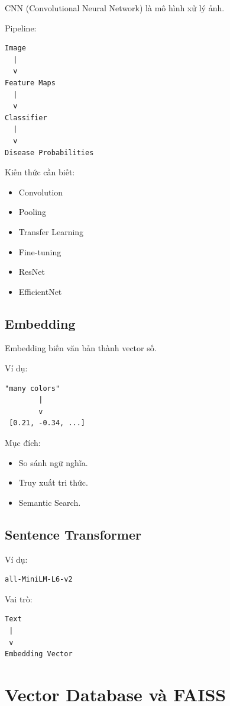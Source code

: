 \documentclass[12pt,a4paper]{article}
\begin{document}
CNN (Convolutional Neural Network) là mô hình xử lý ảnh.

Pipeline:

\begin{verbatim}
Image
  |
  v
Feature Maps
  |
  v
Classifier
  |
  v
Disease Probabilities
\end{verbatim}

Kiến thức cần biết:

\begin{itemize}
\item Convolution
\item Pooling
\item Transfer Learning
\item Fine-tuning
\item ResNet
\item EfficientNet
\end{itemize}

\subsection{Embedding}

Embedding biến văn bản thành vector số.

Ví dụ:

\begin{verbatim}
"many colors"
        |
        v
 [0.21, -0.34, ...]
\end{verbatim}

Mục đích:

\begin{itemize}
\item So sánh ngữ nghĩa.
\item Truy xuất tri thức.
\item Semantic Search.
\end{itemize}

\subsection{Sentence Transformer}

Ví dụ:

\begin{verbatim}
all-MiniLM-L6-v2
\end{verbatim}

Vai trò:

\begin{verbatim}
Text
 |
 v
Embedding Vector
\end{verbatim}

\section{Vector Database và FAISS}
\end{document}
